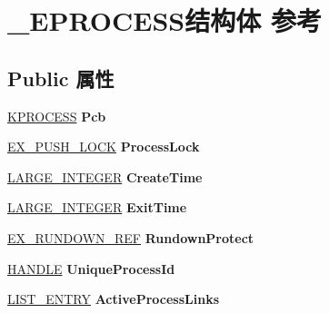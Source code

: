 \hypertarget{struct___e_p_r_o_c_e_s_s}{}\section{\+\_\+\+E\+P\+R\+O\+C\+E\+S\+S结构体 参考}
\label{struct___e_p_r_o_c_e_s_s}
\subsection*{Public 属性}
\begin{DoxyCompactItemize}
\item 
\mbox{\label{struct___e_p_r_o_c_e_s_s_a411f5e3ef61c5b27ae300c69330485a3}} 
\hyperlink{struct___k_p_r_o_c_e_s_s}{K\+P\+R\+O\+C\+E\+SS} {\bfseries Pcb}
\item 
\mbox{\label{struct___e_p_r_o_c_e_s_s_a6c692552f61c0237ee06948ca94aa0eb}} 
\hyperlink{struct___e_x___p_u_s_h___l_o_c_k}{E\+X\+\_\+\+P\+U\+S\+H\+\_\+\+L\+O\+CK} {\bfseries Process\+Lock}
\item 
\mbox{\label{struct___e_p_r_o_c_e_s_s_a9dea01329f06582a9de738c847c25202}} 
\hyperlink{union___l_a_r_g_e___i_n_t_e_g_e_r}{L\+A\+R\+G\+E\+\_\+\+I\+N\+T\+E\+G\+ER} {\bfseries Create\+Time}
\item 
\mbox{\label{struct___e_p_r_o_c_e_s_s_ac518d09e2b1e1dc6e4bf5fc960d273ee}} 
\hyperlink{union___l_a_r_g_e___i_n_t_e_g_e_r}{L\+A\+R\+G\+E\+\_\+\+I\+N\+T\+E\+G\+ER} {\bfseries Exit\+Time}
\item 
\mbox{\label{struct___e_p_r_o_c_e_s_s_af58a3eaf550ca39496419f32644b8ff8}} 
\hyperlink{struct___e_x___r_u_n_d_o_w_n___r_e_f}{E\+X\+\_\+\+R\+U\+N\+D\+O\+W\+N\+\_\+\+R\+EF} {\bfseries Rundown\+Protect}
\item 
\mbox{\label{struct___e_p_r_o_c_e_s_s_aa30a213a9083e825f46ed0b6f3d330a2}} 
\hyperlink{interfacevoid}{H\+A\+N\+D\+LE} {\bfseries Unique\+Process\+Id}
\item 
\mbox{\label{struct___e_p_r_o_c_e_s_s_a07724249165f86ec6e578840647f281a}} 
\hyperlink{struct___l_i_s_t___e_n_t_r_y}{L\+I\+S\+T\+\_\+\+E\+N\+T\+RY} {\bfseries Active\+Process\+Links}

\end{DoxyCompactItemize}
